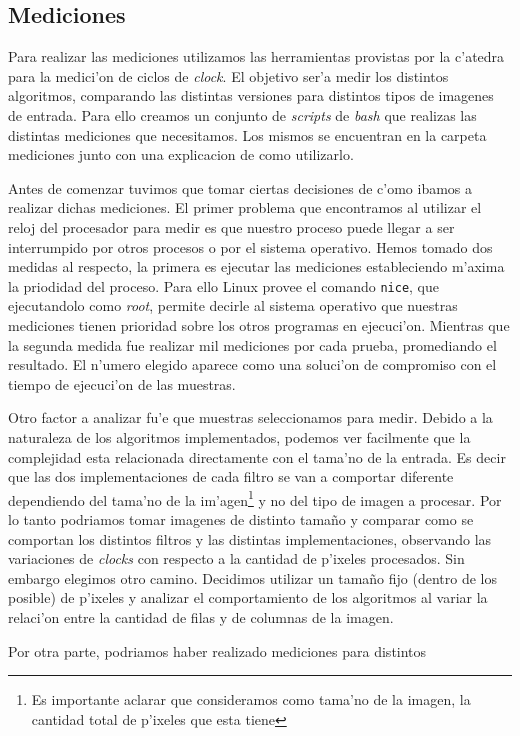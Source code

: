 \subsection{Mediciones}
Para realizar las mediciones utilizamos las herramientas provistas por la c'atedra para la medici'on de ciclos de \textit{clock}. El objetivo ser'a medir los distintos algoritmos, comparando las distintas versiones para distintos tipos de imagenes de entrada. Para ello creamos un conjunto de \textit{scripts} de \textit{bash} que realizas las distintas mediciones que necesitamos. Los mismos se encuentran en la carpeta mediciones junto con una explicacion de como utilizarlo.

Antes de comenzar tuvimos que tomar ciertas decisiones de c'omo ibamos a realizar dichas mediciones. El primer problema que encontramos al utilizar el reloj del procesador para medir es que nuestro proceso puede llegar a ser interrumpido por otros procesos o por el sistema operativo. Hemos tomado dos medidas al respecto, la primera es ejecutar las mediciones estableciendo m'axima la priodidad del proceso. Para ello Linux provee el comando \texttt{nice}, que ejecutandolo como \textit{root}, permite decirle al sistema operativo que nuestras mediciones tienen prioridad sobre los otros programas en ejecuci'on. 
Mientras que la segunda medida fue realizar mil mediciones por cada prueba, promediando el resultado. El n'umero elegido aparece como una soluci'on de compromiso con el tiempo de ejecuci'on de las muestras.

Otro factor a analizar fu'e que muestras seleccionamos para medir. Debido a la naturaleza de los algoritmos implementados, podemos ver facilmente que la complejidad esta relacionada directamente con el tama'no de la entrada. Es decir que las dos implementaciones de cada filtro se van a comportar diferente dependiendo del tama'no de la im'agen\footnote{Es importante aclarar que consideramos como tama'no de la imagen, la cantidad total de p'ixeles que esta tiene} y no del tipo de imagen a procesar. Por lo tanto podriamos tomar imagenes de distinto tamaño y comparar como se comportan los distintos filtros y las distintas implementaciones, observando las variaciones de \textit{clocks} con respecto a la cantidad de p'ixeles procesados. Sin embargo elegimos otro camino. Decidimos utilizar un tamaño fijo (dentro de los posible) de p'ixeles y analizar el comportamiento de los algoritmos al variar la relaci'on entre la cantidad de filas y de columnas de la imagen.

Por otra parte, podriamos haber realizado mediciones para distintos 



